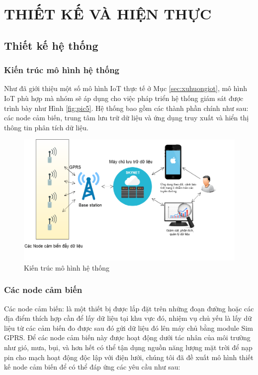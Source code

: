 \ifpdf
\graphicspath{{Chapter3/Figs/Raster/}{Chapter3/Figs/PDF/}{Chapter3/Figs/}{Chapter3/Figs/Web/}{Chapter3/Figs/Server/}{Chapter3/Figs/Mobile/}}
\else
\graphicspath{{Chapter3/Figs/Vector/}{Chapter3/Figs/}}
\fi

\chapter{THIẾT KẾ VÀ HIỆN THỰC}
\section{Thiết kế hệ thống}
\subsection{Kiến trúc mô hình hệ thống}\label{sec: struc}
Như đã giới thiệu một số mô hình IoT thực tế ở Mục \ref{sec:xuhuongiot}, mô hình IoT phù hợp mà nhóm sẽ áp dụng cho việc pháp triển hệ thống giám sát được trình bày như Hình \ref{fig:pic5}. Hệ thống bao gồm các thành phần chính như sau: các node cảm biến, trung tâm lưu trữ dữ liệu và ứng dụng truy xuất và hiển thị thông tin phân tích dữ liệu.

\begin{figure}[H]
	\centering    
	\includegraphics[width=1\textwidth]{system}
	\caption[Kiến trúc mô hình hệ thống]{Kiến trúc mô hình hệ thống}
	\label{fig:system}
\end{figure}

\newpage

\subsection{Các node cảm biến}\label{sec:cacloaicambien}
Các node cảm biến: là một thiết bị được lắp đặt trên những đoạn đường hoặc các địa điểm thích hợp cần để lấy dữ liệu tại khu vực đó, nhiệm vụ chủ yếu là lấy dữ liệu từ các cảm biến đo được sau đó gửi dữ liệu đó lên máy chủ bằng module Sim GPRS.
Để các node cảm biến này được hoạt động dưới tác nhân của môi trường như gió, mưa, bụi, và hơn hết có thể tận dụng nguồn năng lượng mặt trời để nạp pin cho mạch hoạt động độc lập với điện lưới, chúng tôi đã đề xuất mô hình thiết kế node cảm biến để có thể đáp ứng các yêu cầu như sau:
 
